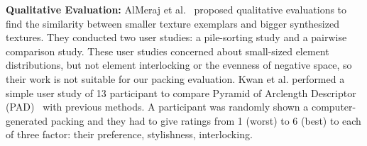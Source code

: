 


\newtext
{
\textbf{Qualitative Evaluation:}
AlMeraj et al.~\cite{AlMerajEval2013} proposed qualitative evaluations to find
the similarity between smaller texture exemplars and bigger synthesized textures.
They conducted two user studies: a pile-sorting study and a pairwise comparison study.
These user studies concerned about small-sized element distributions, but not element interlocking or the evenness of negative space, 
so their work is not suitable for our packing evaluation.
Kwan et al. performed a simple user study of 13 participant to compare 
Pyramid of Arclength Descriptor (PAD)~\cite{Kwan2016} with previous methods.
A participant was randomly shown a computer-generated packing  and they had to give ratings from 1 (worst) to 6 (best)
to each of three factor: their preference, stylishness, interlocking.
}

